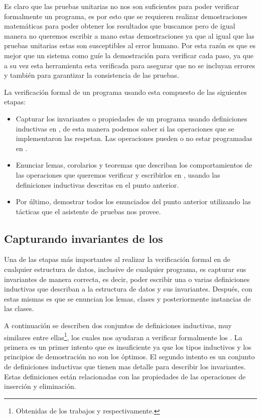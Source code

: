 Es claro que las pruebas unitarias no nos son suficientes para poder verificar formalmente un
programa, es por esto que se requieren realizar demostraciones matemáticas para poder obtener los
resultados que buscamos pero de igual manera no queremos escribir a mano estas demostraciones ya
que al igual que las pruebas unitarias estas son susceptibles al error humano. Por esta raz\'on es que es mejor que un sistema como {\coq} guíe la demostraci\'on para verificar cada paso, ya que a su vez esta herramienta esta verificada para asegurar que no se incluyan errores y también para garantizar la consistencia de las pruebas\cite{Geuvers2009}.

La verificaci\'on formal de un programa usando {\coq} esta compuesto de las siguientes etapas:
\begin{itemize}
    \item Capturar los invariantes o propiedades de un programa usando definiciones inductivas en {\coq}, de
    esta manera podemos saber si las operaciones que se implementaron las respetan. Las operaciones pueden o no estar programadas en {\coq}.
    \item Enunciar lemas, corolarios y teoremas que describan los comportamientos de las
    operaciones que queremos verificar y escribirlos en {\coq}, usando las definiciones inductivas
    descritas en el punto anterior.
    \item Por \'ultimo, demostrar todos los enunciados del punto anterior utilizando las t\'acticas
    que el asistente de pruebas nos provee.
\end{itemize}{}

\subsection{Capturando invariantes de los {\Arns}}
Una de las etapas m\'as importantes al realizar la verificaci\'on formal en {\coq} de cualquier estructura de
datos, inclusive de cualquier programa, es capturar sus invariantes de manera correcta, es decir,
poder escribir una o varias definiciones inductivas que describan a la estructura de datos y sus
invariantes. Después, con estas mismas es que se enuncian los lemas, clases y posteriormente
instancias de las clases.

A continuaci\'on se describen dos conjuntos de definiciones inductivas, muy similares entre ellas\footnote{Obtenidas de los trabajos \cite{tesisG} y \cite{MSetRBT} respectivamente.},
los cuales nos ayudaran a verificar formalmente los {\arns}. La primera es un primer intento que es
insuficiente ya que los tipos inductivos y los principios de demostraci\'on no son los \'optimos.
El segundo intento es un conjunto de definiciones inductivas que tienen mas detalle para describir
los invariantes. Estas definiciones est\'an relacionadas con las propiedades de las operaciones de
inserci\'on y eliminaci\'on.

